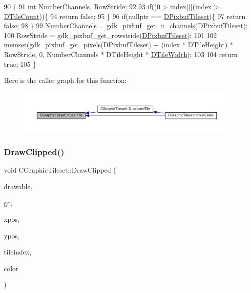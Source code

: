 \begin{DoxyCode}
90                                         \{
91     \textcolor{keywordtype}{int} NumberChannels, RowStride;
92     
93     \textcolor{keywordflow}{if}((0 > index)||(index >= \hyperlink{classCGraphicTileset_a39d942b370e47f441bf97385eb1037c8}{DTileCount}))\{
94         \textcolor{keywordflow}{return} \textcolor{keyword}{false};
95     \}
96     \textcolor{keywordflow}{if}(\textcolor{keyword}{nullptr} == \hyperlink{classCGraphicTileset_a5d5adfcdbb347a6df3f57535ca08e3ef}{DPixbufTileset})\{
97         \textcolor{keywordflow}{return} \textcolor{keyword}{false};
98     \}    
99     NumberChannels = gdk\_pixbuf\_get\_n\_channels(\hyperlink{classCGraphicTileset_a5d5adfcdbb347a6df3f57535ca08e3ef}{DPixbufTileset});
100     RowStride = gdk\_pixbuf\_get\_rowstride(\hyperlink{classCGraphicTileset_a5d5adfcdbb347a6df3f57535ca08e3ef}{DPixbufTileset});
101 
102     memset(gdk\_pixbuf\_get\_pixels(\hyperlink{classCGraphicTileset_a5d5adfcdbb347a6df3f57535ca08e3ef}{DPixbufTileset}) + (index * 
      \hyperlink{classCGraphicTileset_af48f32e07d5fe69afd5f764318cc3244}{DTileHeight}) * RowStride, 0, NumberChannels * DTileHeight * 
      \hyperlink{classCGraphicTileset_a2d0c7d19865b81911a3a43d5cae50e00}{DTileWidth});
103     
104     \textcolor{keywordflow}{return} \textcolor{keyword}{true};
105 \}
\end{DoxyCode}
Here is the caller graph for this function\+:\nopagebreak
\begin{figure}[H]
\begin{center}
\leavevmode
\includegraphics[width=350pt]{classCGraphicTileset_aefeefc9e2ad01ceb8a781bd455859f76_icgraph}
\end{center}
\end{figure}
\hypertarget{classCGraphicTileset_a104935351be4c465f3ff08c111455d19}{}\label{classCGraphicTileset_a104935351be4c465f3ff08c111455d19} 
\subsubsection{\texorpdfstring{Draw\+Clipped()}{DrawClipped()}}
{\footnotesize\ttfamily void C\+Graphic\+Tileset\+::\+Draw\+Clipped (\begin{DoxyParamCaption}\item[{Gdk\+Drawable $\ast$}]{drawable,  }\item[{Gdk\+GC $\ast$}]{gc,  }\item[{gint}]{xpos,  }\item[{gint}]{ypos,  }\item[{int}]{tileindex,  }\item[{guint32}]{color }\end{DoxyParamCaption})}



